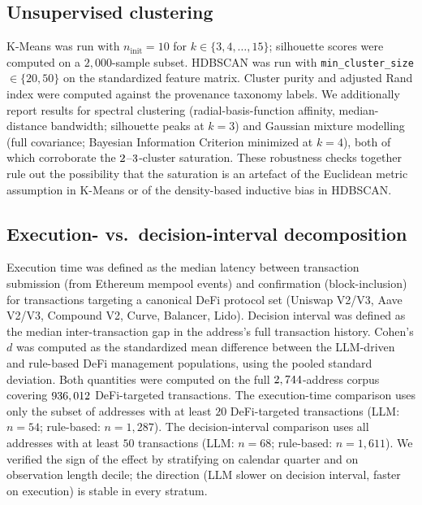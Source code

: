 \documentclass[11pt,a4paper]{article}
\begin{document}
\subsection*{Unsupervised clustering}

K-Means was run with $n_{\text{init}} = 10$ for $k \in \{3, 4, \ldots,
15\}$; silhouette scores were computed on a $2{,}000$-sample subset.
HDBSCAN\cite{scott2015hdbscan} was run with
\texttt{min\_cluster\_size}$\in\{20, 50\}$ on the standardized feature
matrix. Cluster purity and adjusted Rand index were computed against the
provenance taxonomy labels. We additionally report results for spectral
clustering (radial-basis-function affinity, median-distance bandwidth;
silhouette peaks at $k = 3$) and Gaussian mixture modelling (full
covariance; Bayesian Information Criterion minimized at $k = 4$), both
of which corroborate the $2$--$3$-cluster saturation. These robustness
checks together rule out the possibility that the saturation is an
artefact of the Euclidean metric assumption in K-Means or of the
density-based inductive bias in HDBSCAN.

\subsection*{Execution- vs.\ decision-interval decomposition}

Execution time was defined as the median latency between transaction
submission (from Ethereum mempool events) and confirmation
(block-inclusion) for transactions targeting a canonical DeFi protocol
set (Uniswap V2/V3, Aave V2/V3, Compound V2, Curve, Balancer, Lido).
Decision interval was defined as the median inter-transaction gap in the
address's full transaction history. Cohen's $d$\cite{cohen1988statistical}
was computed as the standardized mean difference between the LLM-driven
and rule-based DeFi management populations, using the pooled standard
deviation. Both quantities were computed on the full $2,744$-address
corpus covering $936,012$ DeFi-targeted transactions. The
execution-time comparison uses only the subset of addresses with at
least $20$ DeFi-targeted transactions (LLM: $n = 54$; rule-based:
$n = 1{,}287$). The decision-interval comparison uses all addresses with
at least $50$ transactions (LLM: $n = 68$; rule-based: $n = 1{,}611$).
We verified the sign of the effect by stratifying on calendar quarter and
on observation length decile; the direction (LLM slower on decision
interval, faster on execution) is stable in every stratum.
\end{document}

